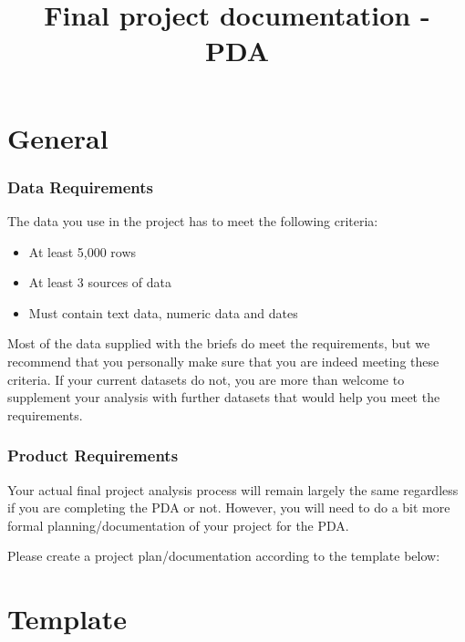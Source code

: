 \documentclass[
]{article}
\title{Final project documentation - PDA}
\author{}
\date{\vspace{-2.5em}}
\providecommand{\tightlist}{%
  \setlength{\itemsep}{0pt}\setlength{\parskip}{0pt}}
\begin{document}
\maketitle

{
\setcounter{tocdepth}{2}
\tableofcontents
}
\hypertarget{general}{%
\section{General}\label{general}}

\hypertarget{data-requirements}{%
\subsubsection{Data Requirements}\label{data-requirements}}

The data you use in the project has to meet the following criteria:

\begin{itemize}
\tightlist
\item
  At least 5,000 rows
\item
  At least 3 sources of data
\item
  Must contain text data, numeric data and dates
\end{itemize}

Most of the data supplied with the briefs do meet the requirements, but
we recommend that you personally make sure that you are indeed meeting
these criteria. If your current datasets do not, you are more than
welcome to supplement your analysis with further datasets that would
help you meet the requirements.

\hypertarget{product-requirements}{%
\subsubsection{Product Requirements}\label{product-requirements}}

Your actual final project analysis process will remain largely the same
regardless if you are completing the PDA or not. However, you will need
to do a bit more formal planning/documentation of your project for the
PDA.

Please create a project plan/documentation according to the template
below:

\hypertarget{template}{%
\section{Template}\label{template}}
\end{document}
